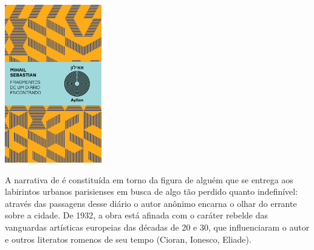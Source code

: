 \pagebreak

\hspace{.5cm}

\begin{center}
\hspace*{-4.5cm}
\hspace*{4cm}\includegraphics[width=42mm]{./imgs/sebastian.png}
\end{center}

\hspace*{-7cm}\hrulefill\hspace*{-7cm}

\medskip

\noindent{}A narrativa de {} é constituída em torno da figura de alguém que se entrega aos labirintos urbanos parisienses em busca de algo tão perdido quanto indefinível: através das passagens desse diário o autor anônimo encarna o olhar do errante sobre a cidade. De 1932, a obra está afinada com o caráter rebelde das vanguardas artísticas europeias das décadas de 20 e 30, que influenciaram o autor e outros literatos romenos de seu tempo (Cioran, Ionesco, Eliade).

\vfill

\hspace*{-.4cm}\begin{minipage}[c]{1\linewidth}
\small{
{}}
\end{minipage}

\pagebreak
